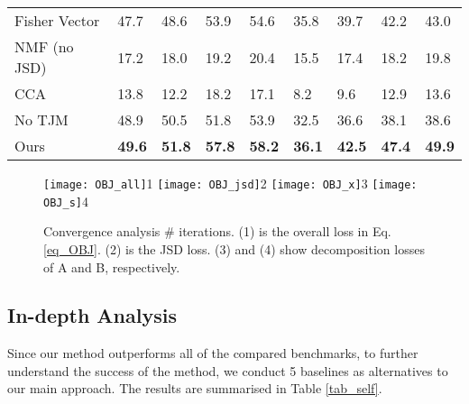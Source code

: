 \documentclass[10pt,twocolumn,letterpaper]{article}
\begin{document}
\begin{table*}[]
\begin{tabular}{l|ll|ll|ll|ll}
		Fisher Vector     & 47.7             & 48.6           & 53.9            & 54.6           & 35.8             & 39.7           & 42.2            & 43.0           \\
		NMF (no JSD)      & 17.2             & 18.0           & 19.2            & 20.4           & 15.5             & 17.4           & 18.2            & 19.8           \\
		CCA               & 13.8             & 12.2           & 18.2            & 17.1           & 8.2              & 9.6            & 12.9            & 13.6           \\
		No TJM            & 48.9             & 50.5           & 51.8            & 53.9           & 32.5             & 36.6           & 38.1            & 38.6           \\ \hline
		Ours              & \textbf{49.6}             & \textbf{51.8 }          & \textbf{57.8}            & \textbf{58.2 }          & \textbf{36.1 }            & \textbf{42.5}           & \textbf{47.4}            & \textbf{49.9}          \\\hline
	\end{tabular}
	\vspace{1ex}
	\caption{In-depth analysis with baseline approaches. `Ours' refers to the complete pipeline with deep features, GMIL kernel embedding, URL with NMF and JSD, and TJM. (Results are in \%).}
	\label{tab_self}
	\vspace{-2ex}
\end{table*}


\begin{figure}
	\centering
	\texttt{[image: OBJ\_all]}1
	\texttt{[image: OBJ\_jsd]}2
	\texttt{[image: OBJ\_x]}3
	\texttt{[image: OBJ\_s]}4
\caption{Convergence analysis \wrt \# iterations. (1) is the overall loss in Eq. \ref{eq_OBJ}. (2) is the JSD loss. (3) and (4) show  decomposition losses of A and B, respectively.\label{fig_convergence}}
	\vspace{-2ex}
\end{figure}

\subsection{In-depth Analysis}
Since our method outperforms all of the compared benchmarks, to further understand the success of the method, we conduct 5 baselines as alternatives to our main approach. The results are summarised in Table \ref{tab_self}. 
\end{document}
